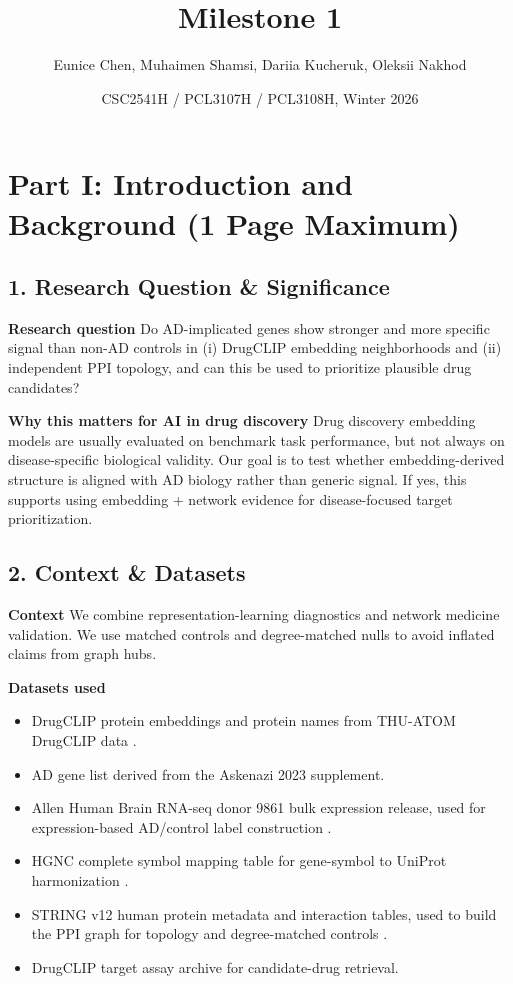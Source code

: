 \documentclass{article}
\title{Milestone 1}
\author{Eunice Chen, Muhaimen Shamsi, Dariia Kucheruk, Oleksii Nakhod}
\date{CSC2541H / PCL3107H / PCL3108H, Winter 2026}
\begin{document}
\maketitle

\section*{Part I: Introduction and Background (1 Page Maximum)}

\subsection*{1. Research Question \& Significance}
\textbf{Research question} Do AD-implicated genes show stronger and more specific signal than non-AD controls in (i) DrugCLIP embedding neighborhoods and (ii) independent PPI topology, and can this be used to prioritize plausible drug candidates?

\textbf{Why this matters for AI in drug discovery} Drug discovery embedding models are usually evaluated on benchmark task performance, but not always on disease-specific biological validity. Our goal is to test whether embedding-derived structure is aligned with AD biology rather than generic signal. If yes, this supports using embedding + network evidence for disease-focused target prioritization.

\subsection*{2. Context \& Datasets}
\textbf{Context} We combine representation-learning diagnostics and network medicine validation. We use matched controls and degree-matched nulls to avoid inflated claims from graph hubs.

\textbf{Datasets used}
\begin{itemize}
    \item DrugCLIP protein embeddings and protein names from THU-ATOM DrugCLIP data \cite{adGwas2025, drugclipData2024}.
    \item AD gene list derived from the Askenazi 2023 supplement.
    \item Allen Human Brain RNA-seq donor 9861 bulk expression release, used for expression-based AD/control label construction \cite{allenAtlas2012}.
    \item HGNC complete symbol mapping table for gene-symbol to UniProt harmonization \cite{hgncCompleteSet}.
    \item STRING v12 human protein metadata and interaction tables, used to build the PPI graph for topology and degree-matched controls \cite{string2025}.
    \item DrugCLIP target assay archive for candidate-drug retrieval.
\end{itemize}
\end{document}
